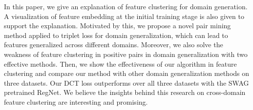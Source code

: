 \documentclass[a4paper,fleqn]{cas-dc}
\begin{document}
In this paper, we give an explanation of feature clustering for domain generation.  A visualization of feature embedding at the initial training stage is also given to support the explanation. Motivated by this, we propose a novel pair mining method applied to triplet loss for domain generalization, which can lead to features generalized across different domains. Moreover, we also solve the weakness of feature clustering in positive pairs in domain generalization with two effective methods. Then, we show the effectiveness of our algorithm in feature clustering and compare our method with  other domain generalization methods on three datasets. Our DCT loss outperforms over all three datasets with the SWAG pretrained RegNet. We believe the insights behind this research on cross-domain feature clustering are interesting and promising.  




















\end{document}
